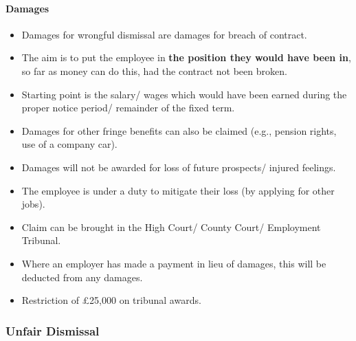 \documentclass[
]{article}
\providecommand{\tightlist}{%
  \setlength{\itemsep}{0pt}\setlength{\parskip}{0pt}}
\begin{document}
\hypertarget{damages}{%
\paragraph{Damages}\label{damages}}

\begin{itemize}
\tightlist
\item
  Damages for wrongful dismissal are damages for breach of contract.
\item
  The aim is to put the employee in \textbf{the position they would have
  been in}, so far as money can do this, had the contract not been
  broken.
\item
  Starting point is the salary/ wages which would have been earned
  during the proper notice period/ remainder of the fixed term.
\item
  Damages for other fringe benefits can also be claimed (e.g., pension
  rights, use of a company car).
\item
  Damages will not be awarded for loss of future prospects/ injured
  feelings.
\item
  The employee is under a duty to mitigate their loss (by applying for
  other jobs).
\item
  Claim can be brought in the High Court/ County Court/ Employment
  Tribunal.
\item
  Where an employer has made a payment in lieu of damages, this will be
  deducted from any damages.
\item
  Restriction of £25,000 on tribunal awards.
\end{itemize}

\hypertarget{unfair-dismissal}{%
\subsubsection{Unfair Dismissal}\label{unfair-dismissal}}
\end{document}

